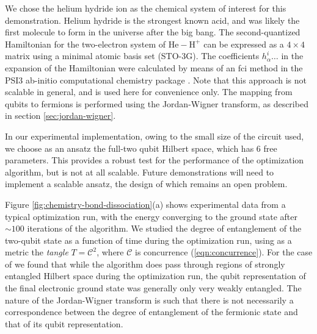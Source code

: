 We chose the helium hydride ion \hehplus as the chemical system of interest for this demonstration. Helium hydride is the strongest known acid, and was likely the first molecule to form in the universe after the big bang. The second-quantized Hamiltonian for the two-electron system of $\mathrm{He-H^+}$ can be expressed as a $4\times4$ matrix using a minimal atomic basis set (STO-3G). The coefficients $h_\alpha^i \ldots$ in the expansion of the Hamiltonian were calculated by means of an \gls{fci} method in the PSI3 ab-initio computational chemistry package \cite{Psi4}. Note that this approach is not scalable in general, and is used here for convenience only. The mapping from qubits to fermions is performed using the Jordan-Wigner transform, as described in section \ref{sec:jordan-wigner}.

In our experimental implementation, owing to the small size of the circuit used, we choose as an ansatz the full-two qubit Hilbert space, which has 6 free parameters. This provides a robust test for the performance of the optimization algorithm, but is not at all scalable. Future demonstrations will need to implement a scalable ansatz, the design of which remains an open problem. 

Figure \ref{fig:chemistry-bond-dissociation}(a) shows experimental data from a typical optimization run, with the energy converging to the ground state after $\sim100$ iterations of the algorithm. We studied the degree of entanglement of the two-qubit state as a function of time during the optimization run, using as a metric the \emph{tangle} $T=\mathcal{C}^2$, where $\mathcal{C}$ is concurrence (\ref{eqn:concurrence}). For the case of \hehplus we found that while the algorithm does pass through regions of strongly entangled Hilbert space during the optimization run, the qubit representation of the final electronic ground state was generally only very weakly entangled. The nature of the Jordan-Wigner transform is such that there is not necessarily a correspondence between the degree of entanglement of the fermionic state and that of its qubit representation.

